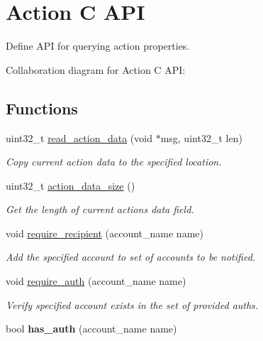 \hypertarget{group__actioncapi}{}\section{Action C A\+PI}
\label{group__actioncapi}


Define A\+PI for querying action properties.  


Collaboration diagram for Action C A\+PI\+:
\subsection*{Functions}
\begin{DoxyCompactItemize}
\item 
uint32\+\_\+t \mbox{\hyperlink{group__actioncapi_ga4de6d1722b92b464ba2c999e0a636f84}{read\+\_\+action\+\_\+data}} (void $\ast$msg, uint32\+\_\+t len)
\begin{DoxyCompactList}\small\item\em Copy current action data to the specified location. \end{DoxyCompactList}\item 
uint32\+\_\+t \mbox{\hyperlink{group__actioncapi_ga9d5497faab78ecdc03052cf644d72a5e}{action\+\_\+data\+\_\+size}} ()
\begin{DoxyCompactList}\small\item\em Get the length of current action\textquotesingle{}s data field. \end{DoxyCompactList}\item 
void \mbox{\hyperlink{group__actioncapi_gae232893c733f02b94dbb70fae39d19f7}{require\+\_\+recipient}} (account\+\_\+name name)
\begin{DoxyCompactList}\small\item\em Add the specified account to set of accounts to be notified. \end{DoxyCompactList}\item 
void \mbox{\hyperlink{group__actioncapi_gab1e668e93ac1f94421743ed79edffb26}{require\+\_\+auth}} (account\+\_\+name name)
\begin{DoxyCompactList}\small\item\em Verify specified account exists in the set of provided auths. \end{DoxyCompactList}\item 
\mbox{\label{group__actioncapi_ga38a837d8c12a0cf02b729be1e13b0765}} 
bool {\bfseries has\+\_\+auth} (account\+\_\+name name)

\end{DoxyCompactItemize}
